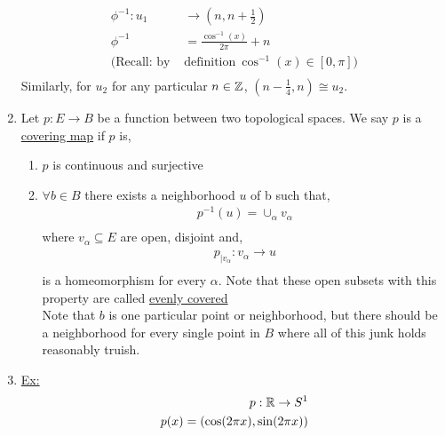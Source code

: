 \begin{enumerate}
            \begin{align*}
                \phi^{-1}: u_1&\rightarrow(n,n+\frac{1}{2})\\
                \phi^{-1}&=\frac{\cos^{-1} (x)}{2\pi}+n\\
                (\text{Recall: by }&\text{definition}\ \cos^{-1}(x)\in[0,\pi])\\
            \end{align*}
            Similarly, for $u_2$ for any particular $n\in \mathbb{Z}$, $(n-\frac{1}{4}, n)\cong u_2$.
        \item 
            \begin{definition} Let $p:E \rightarrow B$ be a function between two topological spaces. We say
                $p$ is a \underline{covering map} if $p$ is,
                \begin{enumerate}
                    \item $p$ is continuous and surjective
                    \item $\forall b\in B$ there exists a neighborhood $u$ of b such that,
                        \begin{align*}
                            p^{-1}(u)=\cup_{\alpha}v_{\alpha}\\
                        \end{align*}
                        where $v_\alpha\subseteq E$ are open, disjoint and,
                        \begin{align*}
                            p_{|v_{\alpha}}:v_{\alpha}\rightarrow u\\
                        \end{align*}
                        is a homeomorphism for every $\alpha$. Note that these open subsets with this property are called
                        \underline{evenly covered}\\
                        Note that $b$ is one particular point or neighborhood, but there should be a neighborhood for every single
                        point in $B$ where all of this junk holds reasonably truish.
                \end{enumerate}
            \end{definition}
        \item \underline{Ex:}
            \begin{align*}
                p: \R \rightarrow S^1\\
                p(x)=(\cos(2\pi x), \sin(2\pi x))\\

\end{align*}
\end{enumerate}
